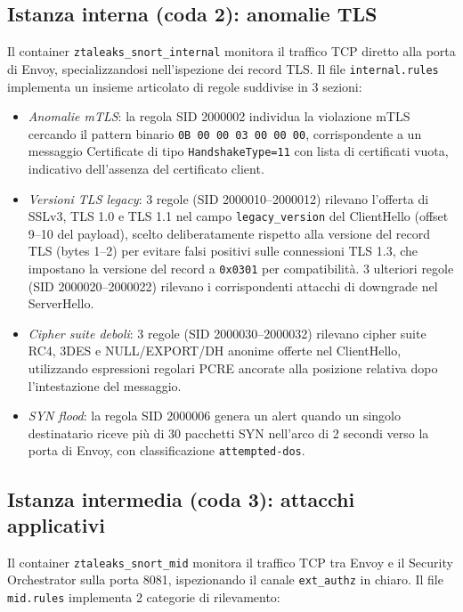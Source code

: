 \subsection*{Istanza interna (coda 2): anomalie TLS}

Il container \texttt{ztaleaks\_snort\_internal} monitora il traffico TCP diretto alla porta di Envoy, specializzandosi nell'ispezione dei record TLS. Il file \texttt{internal.rules} implementa un insieme articolato di regole suddivise in 3 sezioni:

\begin{itemize}
    \item \textit{Anomalie mTLS}: la regola SID 2000002 individua la violazione mTLS cercando il pattern binario \texttt{0B 00 00 03 00 00 00}, corrispondente a un messaggio Certificate di tipo \texttt{HandshakeType=11} con lista di certificati vuota, indicativo dell'assenza del certificato client.

    \item \textit{Versioni TLS legacy}: 3 regole (SID 2000010--2000012) rilevano l'offerta di SSLv3, TLS 1.0 e TLS 1.1 nel campo \texttt{legacy\_version} del ClientHello (offset 9--10 del payload), scelto deliberatamente rispetto alla versione del record TLS (bytes 1--2) per evitare falsi positivi sulle connessioni TLS 1.3, che impostano la versione del record a \texttt{0x0301} per compatibilità. 3 ulteriori regole (SID 2000020--2000022) rilevano i corrispondenti attacchi di downgrade nel ServerHello.

    \item \textit{Cipher suite deboli}: 3 regole (SID 2000030--2000032) rilevano cipher suite RC4, 3DES e NULL/EXPORT/DH anonime offerte nel ClientHello, utilizzando espressioni regolari PCRE ancorate alla posizione relativa dopo l'intestazione del messaggio.

    \item \textit{SYN flood}: la regola SID 2000006 genera un alert quando un singolo destinatario riceve più di 30 pacchetti SYN nell'arco di 2 secondi verso la porta di Envoy, con classificazione \texttt{attempted-dos}.
\end{itemize}

\subsection*{Istanza intermedia (coda 3): attacchi applicativi}

Il container \texttt{ztaleaks\_snort\_mid} monitora il traffico TCP tra Envoy e il Security Orchestrator sulla porta 8081, ispezionando il canale \texttt{ext\_authz} in chiaro. Il file \texttt{mid.rules} implementa 2 categorie di rilevamento:

